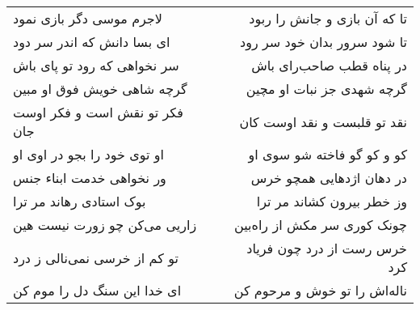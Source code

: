 \begin{center}
\begin{longtable}{l p{0.5cm} r}
\\
لاجرم موسی دگر بازی نمود
&&
تا که آن بازی و جانش را ربود
\\
ای بسا دانش که اندر سر دود
&&
تا شود سرور بدان خود سر رود
\\
سر نخواهی که رود تو پای باش
&&
در پناه قطب صاحب‌رای باش
\\
گرچه شاهی خویش فوق او مبین
&&
گرچه شهدی جز نبات او مچین
\\
فکر تو نقش است و فکر اوست جان
&&
نقد تو قلبست و نقد اوست کان
\\
او توی خود را بجو در اوی او
&&
کو و کو گو فاخته شو سوی او
\\
ور نخواهی خدمت ابناء جنس
&&
در دهان اژدهایی همچو خرس
\\
بوک استادی رهاند مر ترا
&&
وز خطر بیرون کشاند مر ترا
\\
زاریی می‌کن چو زورت نیست هین
&&
چونک کوری سر مکش از راه‌بین
\\
تو کم از خرسی نمی‌نالی ز درد
&&
خرس رست از درد چون فریاد کرد
\\
ای خدا این سنگ دل را موم کن
&&
ناله‌اش را تو خوش و مرحوم کن
\\
\end{longtable}
\end{center}
